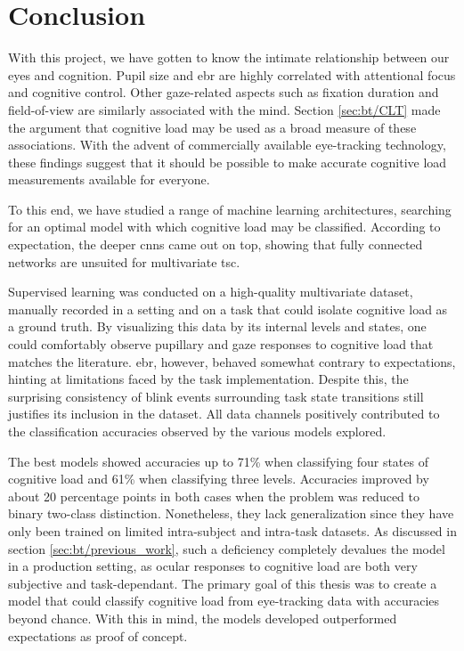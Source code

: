\chapter{Conclusion}

With this project, we have gotten to know the intimate relationship between our eyes and cognition. 
Pupil size and \acrlong{ebr} are highly correlated with attentional focus and cognitive control. Other gaze-related aspects such as fixation duration and field-of-view are similarly associated with the mind. 
Section \ref{sec:bt/CLT} made the argument that cognitive load may be used as a broad measure of these associations. With the advent of commercially available eye-tracking technology, these findings suggest that it should be possible to make accurate cognitive load measurements available for everyone.

To this end, we have studied a range of machine learning architectures, searching for an optimal model with which cognitive load may be classified. According to expectation, the deeper \acrlong{cnn}s came out on top, showing that fully connected networks are unsuited for multivariate \acrlong{tsc}. 

Supervised learning was conducted on a high-quality multivariate dataset, manually recorded in a setting and on a task that could isolate cognitive load as a ground truth. By visualizing this data by its internal levels and states, one could comfortably observe pupillary and gaze responses to cognitive load that matches the literature. \acrshort{ebr}, however, behaved somewhat contrary to expectations, hinting at limitations faced by the task implementation. Despite this, the surprising consistency of blink events surrounding task state transitions still justifies its inclusion in the dataset. All data channels positively contributed to the classification accuracies observed by the various models explored.

The best models showed accuracies up to 71\% when classifying four states of cognitive load and 61\% when classifying three levels. Accuracies improved by about 20 percentage points in both cases when the problem was reduced to binary two-class distinction. Nonetheless, they lack generalization since they have only been trained on limited intra-subject and intra-task datasets. As discussed in section \ref{sec:bt/previous_work}, such a deficiency completely devalues the model in a production setting, as ocular responses to cognitive load are both very subjective and task-dependant. 
The primary goal of this thesis was to create a model that could classify cognitive load from eye-tracking data with accuracies beyond chance. With this in mind, the models developed outperformed expectations as proof of concept.


